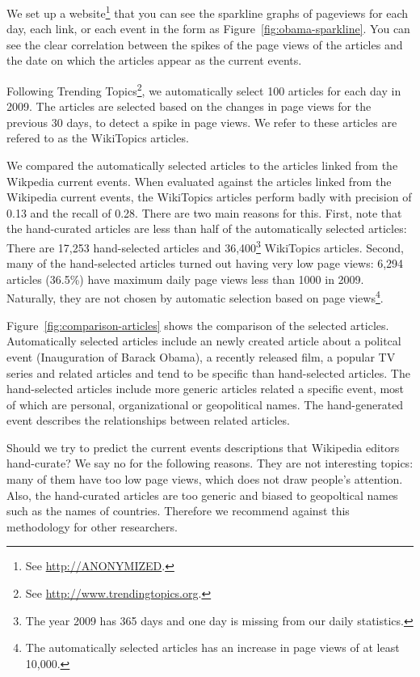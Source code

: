 \documentclass[11pt]{article}
\newcommand{\war}[1]{{\sf\small #1}}
\begin{document}
We set up a website\footnote{See \url{http://ANONYMIZED}.} that you can see the sparkline
graphs of pageviews for each day, each link, or each event in the form as Figure~\ref{fig:obama-sparkline}.
You can see the clear correlation between the spikes of the page views of the articles and the date on which the articles appear as the current events.

Following Trending Topics\footnote{See \url{http://www.trendingtopics.org}.}, we automatically select 100 articles for each day in 2009. The articles are selected based on the changes in page views for the previous 30 days, to detect a spike in page views. We refer to these articles are refered to as the WikiTopics articles.

We compared the automatically selected articles to the articles linked from the Wikpedia current events.
When evaluated against the articles linked from the Wikipedia current events, the WikiTopics articles perform badly with precision of 0.13 and the recall of 0.28.
There are two main reasons for this.
First, note that the hand-curated articles are less than half of the automatically selected articles:
There are 17,253 hand-selected articles and 36,400\footnote{The year 2009 has 365 days and one day is missing from our daily statistics.} WikiTopics articles.
Second, many of the hand-selected articles turned out having very low page views:
6,294 articles (36.5\%) have maximum daily page views less than 1000 in 2009.
Naturally, they are not chosen by automatic selection based on page views\footnote{The automatically selected articles has an increase in page views of at least 10,000.}.

Figure~\ref{fig:comparison-articles} shows the comparison of the selected articles.
Automatically selected articles include an newly created article about a politcal event
(\war{Inauguration of Barack Obama}), a recently released film, a popular TV series and
related articles and tend to be specific than hand-selected articles.
The hand-selected articles include more generic articles related a specific event,
most of which are personal, organizational or geopolitical names.
The hand-generated event describes the relationships between related articles.

Should we try to predict the current events descriptions
that Wikipedia editors hand-curate? We say no for the following reasons.
They are not interesting topics: many of them have too low page views,
which does not draw people's attention.
Also, the hand-curated articles are too generic and biased to geopoltical names
such as the names of countries.
Therefore we recommend against this methodology for other researchers.
\end{document}

